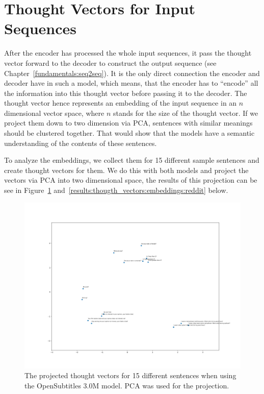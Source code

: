 \section{Thought Vectors for Input Sequences} After the encoder has processed the whole input sequences, it pass the thought vector forward to the decoder to construct the output sequence (see Chapter~\ref{fundamentals:seq2seq}). It is the only direct connection the encoder and decoder have in such a model, which means, that the encoder has to ``encode'' all the information into this thought vector before passing it to the decoder. The thought vector hence represents an embedding of the input sequence in an $n$ dimensional vector space, where $n$ stands for the size of the thought vector. If we project them down to two dimension via PCA, sentences with similar meanings should be clustered together. That would show that the models have a semantic understanding of the contents of these sentences.

To analyze the embeddings, we collect them for 15 different sample sentences and create thought vectors for them. We do this with both models and project the vectors via PCA into two dimensional space, the results of this projection can be see in Figure~\ref{results:thougth_vectors:embeddings:opensubtitles} and~\ref{results:thougth_vectors:embeddings:reddit} below.

\begin{figure}[!tb]
	\centering
	\includegraphics[width=14cm]{img/opensubtitles_thought_vector_embeddings.png}
	\caption{The projected thought vectors for 15 different sentences when using the OpenSubtitles 3.0M model. PCA was used for the projection.}
	\label{results:thougth_vectors:embeddings:opensubtitles}
\end{figure}

